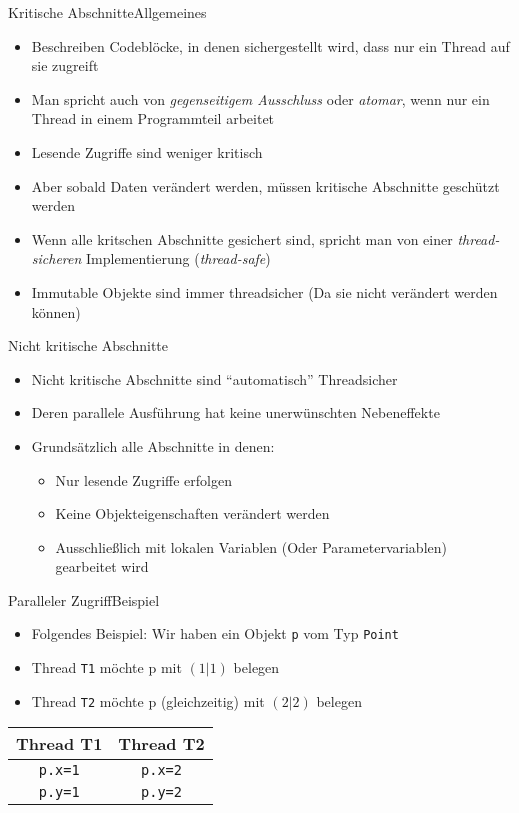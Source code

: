 \begin{frame}{Kritische Abschnitte}{Allgemeines}
    \begin{itemize}
        \item Beschreiben Codeblöcke, in denen sichergestellt wird, dass nur ein Thread auf sie zugreift
        \item Man spricht auch von \textit{gegenseitigem Ausschluss} oder \textit{atomar}, wenn nur ein Thread in einem Programmteil arbeitet
        \item Lesende Zugriffe sind weniger kritisch
        \item Aber sobald Daten verändert werden, müssen kritische Abschnitte geschützt werden
        \item Wenn alle kritschen Abschnitte gesichert sind, spricht man von einer \textit{thread-sicheren} Implementierung (\textit{thread-safe})
        \item Immutable Objekte sind immer threadsicher (Da sie nicht verändert werden können)
    \end{itemize}
\end{frame}

\begin{frame}{Nicht kritische Abschnitte}{}
    \begin{itemize}
        \item Nicht kritische Abschnitte sind "`automatisch"' Threadsicher
        \item Deren parallele Ausführung hat keine unerwünschten Nebeneffekte
        \item Grundsätzlich alle Abschnitte in denen:
        \begin{itemize}
            \item Nur lesende Zugriffe erfolgen
            \item Keine Objekteigenschaften verändert werden
            \item Ausschließlich mit lokalen Variablen (Oder Parametervariablen) gearbeitet wird
        \end{itemize}
    \end{itemize}
\end{frame}

\begin{frame}{Paralleler Zugriff}{Beispiel}
    \begin{itemize}
        \item Folgendes Beispiel: Wir haben ein Objekt \texttt{p} vom Typ \texttt{Point}
        \item Thread \texttt{T1} möchte {p} mit $(1|1)$ belegen
        \item Thread \texttt{T2} möchte {p} (gleichzeitig) mit $(2|2)$ belegen
    \end{itemize}
    \begin{tabular}{|c|c|}
    \hline
    \textbf{Thread T1}&\textbf{Thread T2}\\\hline
    \texttt{p.x=1}&\texttt{p.x=2}\\\hline
    \texttt{p.y=1}&\texttt{p.y=2}\\\hline
    \end{tabular}
\end{frame}

